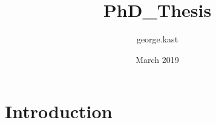 \documentclass{article}
\title{PhD_Thesis}
\author{george.kast }
\date{March 2019}
\begin{document}
\maketitle

\section{Introduction}
\end{document}
